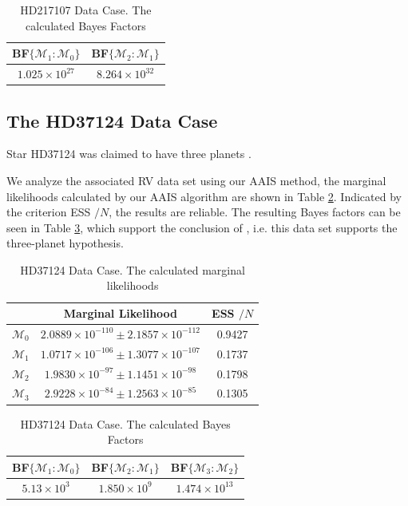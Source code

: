 \documentclass[aoas]{imsart}
\def\ESS{\textsf{ESS }}
\def\BF{\textsf{BF}}
\begin{document}
\begin{table}
\begin{tabular}{c|c}
 \BF$\{\mathcal{M}_1:\mathcal{M}_0\}$ & \BF$\{\mathcal{M}_2:\mathcal{M}_1\}$\\
\hline $1.025\times10^{27}$& $8.264\times10^{32}$\\
\hline
\end{tabular}
\caption{HD217107 \citep{vogt2005five} Data Case. The calculated
Bayes Factors}\label{Bayes_factor_HD217107}
\end{table}

\subsection{The HD37124 Data Case}
Star HD37124 was claimed to have three planets \citep{vogt2005five}.

We analyze the associated RV data set using our AAIS method, the
marginal likelihoods calculated by our AAIS algorithm are shown in
Table \ref{marginal_likelihood_37124}. Indicated by the criterion
\ESS$/N$, the results are reliable. The resulting Bayes factors can
be seen in Table \ref{Bayes_factor_37124}, which support the
conclusion of \cite{tinney20062}, i.e. this data set supports the
three-planet hypothesis.

\begin{table}
\begin{tabular}{c|c|c}
 & Marginal Likelihood & \ESS$/N$\\
\hline $\mathcal{M}_0$ & $2.0889\times10^{-110}\pm2.1857\times10^{-112}$ & 0.9427\\
\hline $\mathcal{M}_1$ & $1.0717\times10^{-106}\pm1.3077\times10^{-107}$ & 0.1737\\
\hline $\mathcal{M}_2$ & $1.9830\times10^{-97}\pm1.1451\times10^{-98}$ & 0.1798 \\
\hline $\mathcal{M}_3$ & $2.9228\times10^{-84}\pm1.2563\times10^{-85}$ & 0.1305 \\
\hline
\end{tabular}
\caption{HD37124 \citep{vogt2005five} Data Case. The calculated
marginal likelihoods}\label{marginal_likelihood_37124}
\end{table}

\begin{table}
\begin{tabular}{c|c|c}
\BF$\{\mathcal{M}_1:\mathcal{M}_0\}$ &\BF$\{\mathcal{M}_2:\mathcal{M}_1\}$ & \BF$\{\mathcal{M}_3:\mathcal{M}_2\}$\\
\hline $5.13\times10^3$ & $1.850\times10^9$ & $1.474\times10^{13}$\\
\hline
\end{tabular}
\caption{HD37124 \citep{vogt2005five} Data Case. The calculated
Bayes Factors}\label{Bayes_factor_37124}
\end{table}
\end{document}
